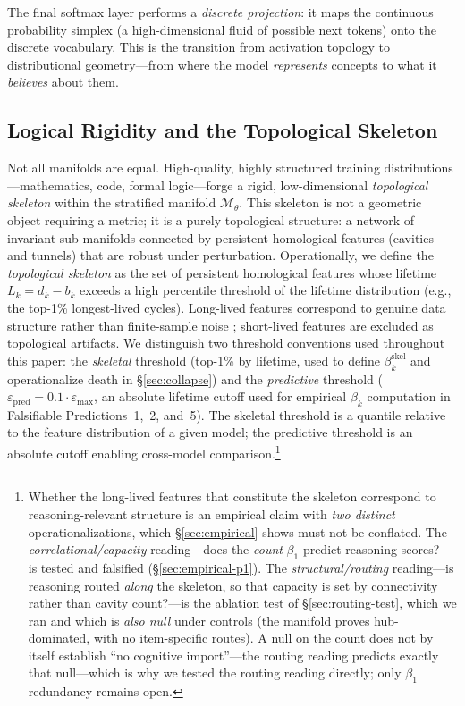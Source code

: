 \documentclass{article}
\begin{document}
The final softmax layer performs a \emph{discrete projection}: it maps the continuous probability simplex (a high-dimensional fluid of possible next tokens) onto the discrete vocabulary. This is the transition from activation topology to distributional geometry---from where the model \emph{represents} concepts to what it \emph{believes} about them.

\subsection{Logical Rigidity and the Topological Skeleton}

Not all manifolds are equal. High-quality, highly structured training distributions---mathematics, code, formal logic---forge a rigid, low-dimensional \emph{topological skeleton} within the stratified manifold $\mathcal{M}_\theta$. This skeleton is not a geometric object requiring a metric; it is a purely topological structure: a network of invariant sub-manifolds connected by persistent homological features (cavities and tunnels) that are robust under perturbation. Operationally, we define the \emph{topological skeleton} as the set of persistent homological features whose lifetime $L_k = d_k - b_k$ exceeds a high percentile threshold of the lifetime distribution (e.g., the top-1\% longest-lived cycles). Long-lived features correspond to genuine data structure rather than finite-sample noise \citep{otter2017roadmap}; short-lived features are excluded as topological artifacts. We distinguish two threshold conventions used throughout this paper: the \emph{skeletal} threshold (top-1\% by lifetime, used to define $\beta_k^{\text{skel}}$ and operationalize death in \S\ref{sec:collapse}) and the \emph{predictive} threshold ($\varepsilon_{\text{pred}} = 0.1 \cdot \varepsilon_{\max}$, an absolute lifetime cutoff used for empirical $\beta_k$ computation in Falsifiable Predictions~1,~2, and~5). The skeletal threshold is a quantile relative to the feature distribution of a given model; the predictive threshold is an absolute cutoff enabling cross-model comparison.\footnote{Whether the long-lived features that constitute the skeleton correspond to reasoning-relevant structure is an empirical claim with \emph{two distinct} operationalizations, which \S\ref{sec:empirical} shows must not be conflated. The \emph{correlational/capacity} reading---does the \emph{count} $\beta_1$ predict reasoning scores?---is tested and falsified (\S\ref{sec:empirical-p1}). The \emph{structural/routing} reading---is reasoning routed \emph{along} the skeleton, so that capacity is set by connectivity rather than cavity count?---is the ablation test of \S\ref{sec:routing-test}, which we ran and which is \emph{also null} under controls (the manifold proves hub-dominated, with no item-specific routes). A null on the count does not by itself establish ``no cognitive import''---the routing reading predicts exactly that null---which is why we tested the routing reading directly; only $\beta_1$ redundancy remains open.}
\end{document}
